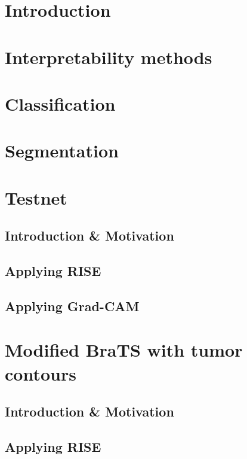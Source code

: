 \chapter{Introduction}


\chapter{Interpretability methods}







\chapter{Classification}


\chapter{Segmentation}


\chapter{Testnet}
\section{Introduction \& Motivation}
\section{Applying RISE}
\section{Applying Grad-CAM}

\chapter{Modified BraTS with tumor contours}
\section{Introduction \& Motivation}
\section{Applying RISE}

